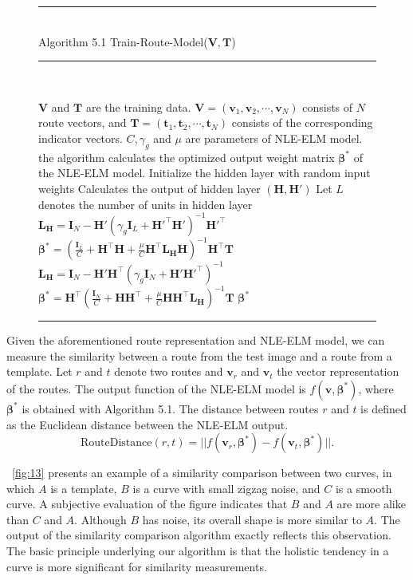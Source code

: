 \documentclass[journal]{IEEEtran}
\newenvironment{myalgorithm}[1]%
{\begin{figure}[!h]\small\noindent\rule{\linewidth}{1pt}\\#1\vspace{-0.5em}\\%
\rule{\linewidth}{0.5pt}\\\vspace{-1.5em}}%
{\vspace{-0.5em}\rule{\linewidth}{1pt}\end{figure}}
\begin{document}
\begin{myalgorithm}{Algorithm 5.1 Train-Route-Model($\mathbf{V,T}$)}
\begin{algorithmic}[1]
\REQUIRE $\mathbf{V}$ and $\mathbf{T}$ are the training data.
$\mathbf{V}=(\mathbf{v}_1,\mathbf{v}_2,\cdots,\mathbf{v}_N)$
consists of $N$ route vectors, and $\mathbf{T}=(\mathbf{t}_1,\mathbf{t}_2,\cdots,\mathbf{t}_N)$
consists of the corresponding indicator vectors.
$C,\gamma_g$ and $\mu$ are parameters of NLE-ELM model.
\ENSURE the algorithm calculates the optimized output weight matrix $\mathbf\beta^{*}$
of the NLE-ELM model.
\STATE Initialize the hidden layer with random input weights
\STATE Calculates the output of hidden layer $(\mathbf{H,H'})$
\STATE Let $L$ denotes the number of units in hidden layer
  \STATE $\mathbf{L_H}=\mathbf{I}_N-\mathbf{H}'(\gamma_g\mathbf{I}_L+\mathbf{H'^\top H'})^{-1}\mathbf{H'^\top}$
  \STATE $\mathbf\beta^{*}=\left(\frac{\mathbf{I}_L}{C}+\mathbf{H^\top H}+\frac{\mu}{C}\mathbf{H^\top L_H H}\right)^{-1}\mathbf{H^\top T}$
\ELSE
  \STATE $\mathbf{L_H}=\mathbf{I}_N-\mathbf{H'H^\top}(\gamma_g\mathbf{I}_N+\mathbf{H'H'^\top})^{-1}$
  \STATE $\mathbf\beta^{*}=\mathbf{H^\top}\left(\frac{\mathbf{I}_N}{C}+\mathbf{HH^\top}+\frac{\mu}{C}\mathbf{HH^\top L_H}\right)^{-1}\mathbf{T}$
\ENDIF
\RETURN $\mathbf\beta^{*}$
\end{algorithmic}
\end{myalgorithm}

Given the aforementioned route representation and NLE-ELM model,
we can measure the similarity between a route from the test image and a route from a template.
Let $r$ and $t$ denote two routes and $\mathbf{v}_r$ and $\mathbf{v}_t$ the vector representation of the routes.
The output function of the NLE-ELM model is $f(\mathbf{v},\mathbf\beta^{*})$, 
where $\mathbf\beta^{*}$ is obtained with Algorithm 5.1.
The distance between routes $r$ and $t$ is defined as the Euclidean distance between the NLE-ELM output.
\begin{equation}
\mathrm{RouteDistance}(r,t)=||f(\mathbf{v}_r,\mathbf\beta^{*})-f(\mathbf{v}_t,\mathbf\beta^{*})||.
\end{equation}

\figurename~\ref{fig:13} presents an example of a similarity comparison between two curves,
in which $A$ is a template, $B$ is a curve with small zigzag noise, and $C$ is a smooth curve. 
A subjective evaluation of the figure indicates that $B$ and $A$ are more alike than $C$ and $A$. 
Although $B$ has noise, its overall shape is more similar to $A$. 
The output of the similarity comparison algorithm exactly reflects this observation. 
The basic principle underlying our algorithm is that the holistic tendency in a curve is more significant for similarity measurements. 
\end{document}
